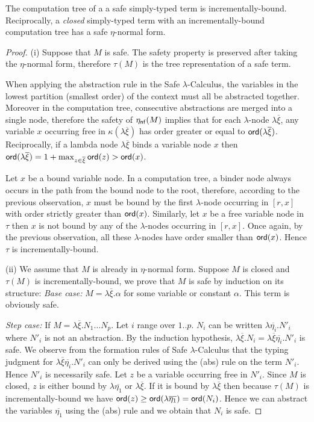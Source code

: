 \documentclass{llncs}
\newcommand\etanf[1]{\eta_{\sf nf}(#1)}
\newcommand\ord[1]{{\sf ord}(#1)}
\begin{document}
\begin{lemma}
\label{lem:safe_imp_incrbound}
The computation tree of a a safe simply-typed term is incrementally-bound.
Reciprocally, a \emph{closed} simply-typed term with an incrementally-bound computation tree has a safe $\eta$-normal form.
\end{lemma}
\begin{proof}
(i) Suppose that $M$ is safe. The safety property is preserved after
taking the $\eta$-normal form, therefore $\tau(M)$ is the tree representation of a safe term.

When applying the abstraction rule in the Safe $\lambda$-Calculus,
the variables in the lowest partition (smallest order) of the
context must all be abstracted together. Moreover in the computation
tree, consecutive abstractions are merged into a single node,
therefore the safety of $\etanf{M}$ implies that for each
$\lambda$-node $\lambda \overline{\xi}$, any variable $x$ occurring
free in $\kappa(\lambda \overline{\xi})$ has order greater or equal
to $\ord{\lambda \overline{\xi}}$. Reciprocally, if a lambda node
$\lambda \overline{\xi}$ binds a variable node $x$ then
$\ord{\lambda \overline{\xi}} = 1+\max_{z\in\overline{\xi}} \ord{z}
> \ord{x}$.

Let $x$ be a bound variable node. In a computation tree, a binder
node always occurs in the path from the bound node to the root,
therefore, according to the previous observation, $x$ must be bound
by the first $\lambda$-node occurring in $[r,x]$ with order strictly
greater than $\ord{x}$. Similarly, let $x$ be a free variable node
in $\tau$ then $x$ is not bound by any of the $\lambda$-nodes
occurring in $[r,x]$. Once again, by the previous observation, all
these $\lambda$-nodes have order smaller than $\ord{x}$. Hence
$\tau$ is incrementally-bound.

(ii) We assume that $M$ is already in $\eta$-normal form. Suppose
$M$ is closed and $\tau(M)$ is incrementally-bound, we prove that
$M$ is safe by induction on its structure: \emph{Base case:} $M =
\lambda \overline{\xi} . \alpha$ for some variable or constant
$\alpha$. This term is obviously safe.

\emph{Step case:} If $M = \lambda \overline{\xi} . N_1 \ldots N_p$.
Let $i$ range over $1..p$. $N_i$ can be written $\lambda
\overline{\eta_i} . N'_i$ where $N'_i$ is not an abstraction. By the
induction hypothesis, $\lambda \overline{\xi} . N_i = \lambda
\overline{\xi} \overline{\eta_i} . N'_i$ is safe. We observe from
the formation rules of Safe $\lambda$-Calculus that the typing
judgment for $\lambda \overline{\xi} \overline{\eta_i} . N'_i$ can
only be derived using the (abs) rule on the term $N'_i$. Hence
$N'_i$ is necessarily safe. Let $z$ be a variable occurring free in
$N'_i$. Since $M$ is closed, $z$ is either bound by $\lambda
\overline{\eta_1}$ or $\lambda \overline{\xi}$. If it is bound by
$\lambda \overline{\xi}$ then because $\tau(M)$ is
incrementally-bound we have $\ord{z} \geq \ord{\lambda
\overline{\eta_1}} = \ord{N_i}$. Hence we can abstract the variables
$\overline{\eta_1}$ using the (abs) rule and we obtain that $N_i$ is
safe.


\end{proof}
\end{document}
